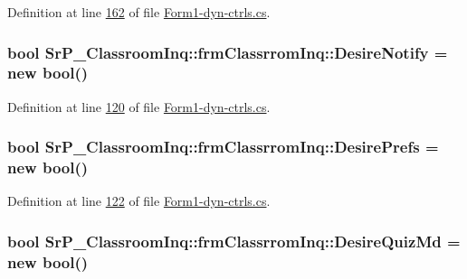 \-Definition at line \hyperlink{_form1-dyn-ctrls_8cs_source_l00162}{162} of file \hyperlink{_form1-dyn-ctrls_8cs_source}{\-Form1-\/dyn-\/ctrls.\-cs}.

\hypertarget{class_sr_p___classroom_inq_1_1frm_classrrom_inq_a39e6b524ac1f9239b638d8c3fe0fca7e}{
\subsubsection[{\-Desire\-Notify}]{\setlength{\rightskip}{0pt plus 5cm}bool {\bf \-Sr\-P\-\_\-\-Classroom\-Inq\-::frm\-Classrrom\-Inq\-::\-Desire\-Notify} = new bool()}}
\label{class_sr_p___classroom_inq_1_1frm_classrrom_inq_a39e6b524ac1f9239b638d8c3fe0fca7e}


\-Definition at line \hyperlink{_form1-dyn-ctrls_8cs_source_l00120}{120} of file \hyperlink{_form1-dyn-ctrls_8cs_source}{\-Form1-\/dyn-\/ctrls.\-cs}.

\hypertarget{class_sr_p___classroom_inq_1_1frm_classrrom_inq_a263bbbace2f9c25e5f92573e5f4845ba}{
\subsubsection[{\-Desire\-Prefs}]{\setlength{\rightskip}{0pt plus 5cm}bool {\bf \-Sr\-P\-\_\-\-Classroom\-Inq\-::frm\-Classrrom\-Inq\-::\-Desire\-Prefs} = new bool()}}
\label{class_sr_p___classroom_inq_1_1frm_classrrom_inq_a263bbbace2f9c25e5f92573e5f4845ba}


\-Definition at line \hyperlink{_form1-dyn-ctrls_8cs_source_l00122}{122} of file \hyperlink{_form1-dyn-ctrls_8cs_source}{\-Form1-\/dyn-\/ctrls.\-cs}.

\hypertarget{class_sr_p___classroom_inq_1_1frm_classrrom_inq_afe88ba4ba5644eaceb0edd49fa307c61}{
\subsubsection[{\-Desire\-Quiz\-Md}]{\setlength{\rightskip}{0pt plus 5cm}bool {\bf \-Sr\-P\-\_\-\-Classroom\-Inq\-::frm\-Classrrom\-Inq\-::\-Desire\-Quiz\-Md} = new bool()}}
\label{class_sr_p___classroom_inq_1_1frm_classrrom_inq_afe88ba4ba5644eaceb0edd49fa307c61}


